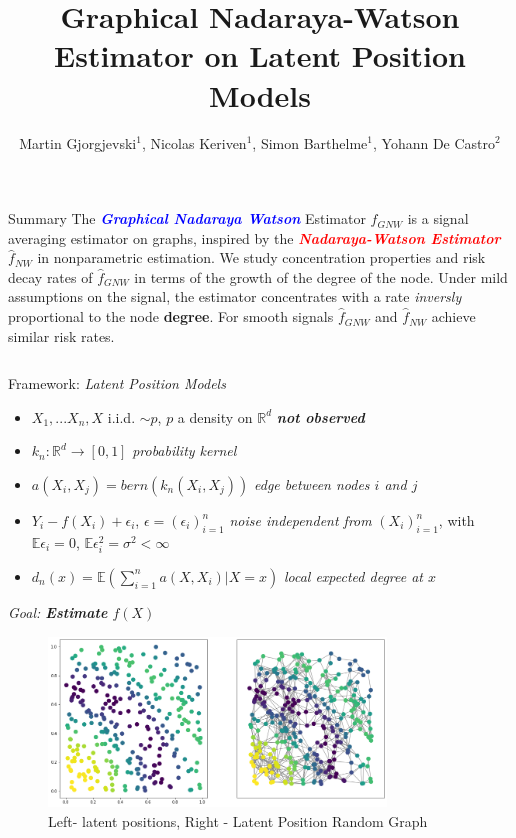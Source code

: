 \documentclass[final,dvipsnames]{beamer}
\title{Graphical Nadaraya-Watson Estimator on Latent Position Models}
\author{Martin Gjorgjevski$^1$, Nicolas Keriven$^1$, Simon Barthelme$^1$, Yohann De Castro$^2$}
\institute{$^1$CNRS, Gipsa-Lab, Grenoble, $^2$Ecole Centrale Lyon, Lyon}
\makeatletter
\newcommand{\myemphh}[1]{\textbf{\textcolor{blue}{#1}}}
\newcommand{\myemphr}[1]{\textbf{\textcolor{red}{#1}}}
\newcommand{\mycolbackgreen}[1]{
\hspace*{.01\linewidth}\begin{minipage}{.35\linewidth}
\begin{mdframed}[backgroundcolor=green!10,linewidth=1pt]
\vspace{10pt}
#1
\vspace{10pt}
\end{mdframed}
\end{minipage}
}
\newcommand*{\rom}[1]{\expandafter\@slowromancap\romannumeral #1@}
\makeatother
\begin{document}
\begin{frame}

\begin{block}{Summary}
    The \textit{\myemphh{Graphical Nadaraya Watson}} Estimator $\hat{f}_{GNW}$ is a signal averaging estimator on graphs, inspired by the \textit{\myemphr{Nadaraya-Watson Estimator}} $\hat{f}_{NW}$ in nonparametric estimation. 
    We study concentration properties and risk decay rates of $\hat{f}_{GNW}$ in terms of the growth of the degree of the node. Under mild assumptions on the signal, the estimator concentrates with a rate \textit{inversly} proportional to the node \textbf{degree}. For smooth signals $\hat{f}_{GNW}$ and $\hat{f}_{NW}$ achieve similar risk rates.    
\end{block}    

\begin{columns}[T]

    

\begin{column}{0.49\textwidth}
\begin{block}{Framework: \textit{Latent Position Models} \hspace*{\fill}{\large{\rom{1}}\qquad}}
\begin{itemize}
\item $X_1,...X_n,X$ i.i.d. $\sim p$, $p$ a density on $\mathbb{R}^d$ 
\textit{\textbf{not observed}}
\vspace{10pt}
\item $k_n:\mathbb{R}^d\to [0,1]$ \textit{probability kernel} 
\vspace{10pt}
\item $a(X_i,X_j)=bern(k_n(X_i,X_j))$ \textit{edge between nodes $i$ and $j$}
\vspace{10pt}
\item $Y_i-f(X_i)+\epsilon_i$, $\epsilon=(\epsilon_i)_{i=1}^n$ \textit{noise independent from} $(X_i)_{i=1}^n$, with $\mathbb{E}\epsilon_i=0$, $\mathbb{E}\epsilon_i^2
=\sigma^2<\infty$ 
\vspace{10pt}
\item $d_n(x)=\mathbb{E}(\sum_{i=1}^n a(X,X_i)|X=x)$ \textit{local expected degree at $x$}
\end{itemize}
\vspace{20pt}
\mycolbackgreen{
    \textit{Goal: \textbf{Estimate} $f(X)$}
}
\begin{figure}
    \centering
    \includegraphics[width=0.8\textwidth]{lpm_image_correct.png}
    \caption{Left- latent positions, Right - Latent Position Random Graph}
    \label{fig:my_label}
    \end{figure}



\end{block}
\end{column}
\end{columns}
\end{frame}
\end{document}
